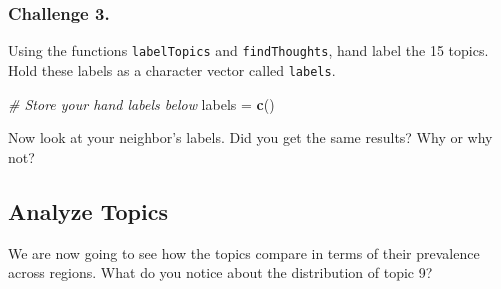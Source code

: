 \documentclass[]{book}
\newenvironment{Shaded}{\begin{snugshade}}{\end{snugshade}}
\newcommand{\KeywordTok}[1]{\textcolor[rgb]{0.13,0.29,0.53}{\textbf{#1}}}
\newcommand{\StringTok}[1]{\textcolor[rgb]{0.31,0.60,0.02}{#1}}
\newcommand{\CommentTok}[1]{\textcolor[rgb]{0.56,0.35,0.01}{\textit{#1}}}
\newcommand{\NormalTok}[1]{#1}
\begin{document}
\subsubsection*{Challenge 3.}\label{challenge-3.-11}

Using the functions \texttt{labelTopics} and \texttt{findThoughts}, hand
label the 15 topics. Hold these labels as a character vector called
\texttt{labels}.

\begin{Shaded}
\begin{Highlighting}[]
\CommentTok{# Store your hand labels below}
\NormalTok{labels =}\StringTok{ }\KeywordTok{c}\NormalTok{()}
\end{Highlighting}
\end{Shaded}

Now look at your neighbor's labels. Did you get the same results? Why or
why not?

\subsection{Analyze Topics}\label{analyze-topics}

We are now going to see how the topics compare in terms of their
prevalence across regions. What do you notice about the distribution of
topic 9?
\end{document}
